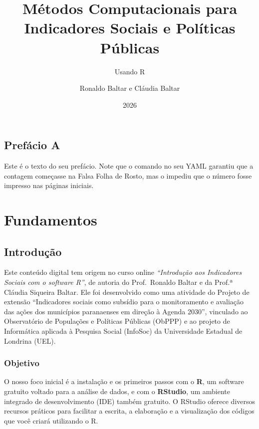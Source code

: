 \documentclass[
  brazilian,
  11pt,
  a4paper,
  open = right,
  twoside = true]{scrbook}
\title{Métodos Computacionais para Indicadores Sociais e Políticas
Públicas}
\subtitle{Usando R}
\author{Ronaldo Baltar e Cláudia Baltar}
\date{2026}
\renewcommand*\contentsname{Índice}
\newcommand\contentsname{Índice}
\begin{document}
\frontmatter
\maketitle

\renewcommand*\contentsname{Índice}
{
\setcounter{tocdepth}{2}
\tableofcontents
}

\mainmatter
{}

\chapter*{Prefácio A}\label{prefuxe1cio-a}


Este é o texto do seu prefácio. Note que o comando no seu YAML garantiu
que a contagem começasse na Falsa Folha de Rosto, mas o impediu que o
número fosse impresso nas páginas iniciais.

\part{Fundamentos}

\chapter*{Introdução}\label{introduuxe7uxe3o}


Este conteúdo digital tem origem no curso online \emph{``Introdução aos
Indicadores Sociais com o software R''}, de autoria do Prof.~Ronaldo
Baltar e da Prof.ª Cláudia Siqueira Baltar. Ele foi desenvolvido como
uma atividade do Projeto de extensão ``Indicadores sociais como subsídio
para o monitoramento e avaliação das ações dos municípios paranaenses em
direção à Agenda 2030'', vinculado ao Observatório de Populações e
Políticas Públicas (ObPPP) e ao projeto de Informática aplicada à
Pesquisa Social (InfoSoc) da Universidade Estadual de Londrina (UEL).

\section*{Objetivo}\label{objetivo}


O nosso foco inicial é a instalação e os primeiros passos com o
\textbf{R}, um software gratuito voltado para a análise de dados, e com
o \textbf{RStudio}, um ambiente integrado de desenvolvimento (IDE)
também gratuito. O RStudio oferece diversos recursos práticos para
facilitar a escrita, a elaboração e a visualização dos códigos que você
criará utilizando o R.
\end{document}
